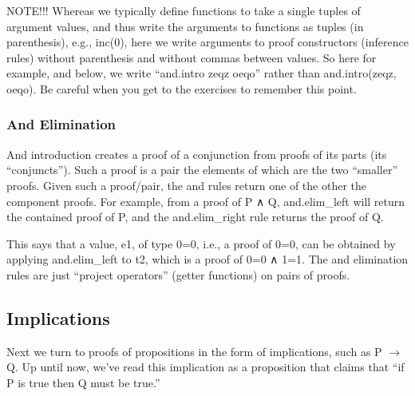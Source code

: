 \documentclass[letterpaper,10pt,english]{sphinxmanual}
\begin{document}
\begin{sphinxVerbatim}[commandchars=\\\{\}]
       
         

 
\end{sphinxVerbatim}

NOTE!!! Whereas we typically define functions to take a single tuples
of argument values, and thus write the arguments to functions as
tuples (in parenthesis), e.g., inc(0), here we write arguments to
proof constructors (inference rules) without parenthesis and without
commas between values. So here for example, and below, we write
“and.intro zeqz oeqo” rather than and.intro(zeqz, oeqo). Be careful
when you get to the exercises to remember this point.


\subsubsection{And Elimination}
\label{\detokenize{15-proofs:and-elimination}}
And introduction creates a proof of a conjunction from proofs of its
parts (its “conjuncts”). Such a proof is a pair the elements of which
are the two “smaller” proofs. Given such a proof/pair, the and
 rules return one of the other the component proofs. For
example, from a proof of P ∧ Q, and.elim\_left will return the
contained proof of P, and the and.elim\_right rule returns the proof of
Q.

\begin{sphinxVerbatim}[commandchars=\\\{\}]
     
\end{sphinxVerbatim}

This says that a value, e1, of type 0=0, i.e., a proof of 0=0, can be
obtained by applying and.elim\_left to t2, which is a proof of 0=0 ∧
1=1. The and elimination rules are just “project operators” (getter
functions) on pairs of proofs.


\subsection{Implications}
\label{\detokenize{15-proofs:implications}}
Next we turn to proofs of propositions in the form of implications,
such as P \(\rightarrow\) Q.  Up until now, we’ve read this implication as a
proposition that claims that “if P is true then Q must be true.”
\end{document}
